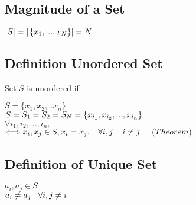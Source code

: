 \documentclass[11pt]{article}
\begin{document}
\subsection{Magnitude of a Set}
\begin{center}
$
|S| = |\hspace{.5mm} \{x_1,...,x_N\}| = N
$
\end{center}




\subsection{Definition Unordered Set}
Set $S$ is unordered if
\begin{center}
$
S = \{x_1,x_2,..x_n\}
$
\\
$
S = S_1 = S_2 = S_N = \{x_{i_1},x_{i_2},...,x_{i_n}\} \hspace{3mm} 
$
\\
$
\forall i_1,i_2,...,i_n,
$
\\
$
\Longleftrightarrow x_i,x_j \in S, x_i = x_j, \hspace{3mm} \forall i,j \hspace{4mm} i\neq j\hspace{5mm} (Theorem)
$
\end{center}




\subsection{Definition of Unique Set}
\begin{center}
$
a_i, a_j \in S
$
\\
$
a_i \neq a_j \hspace{3mm} \forall i,j \neq i
$
\end{center}



\end{document}
